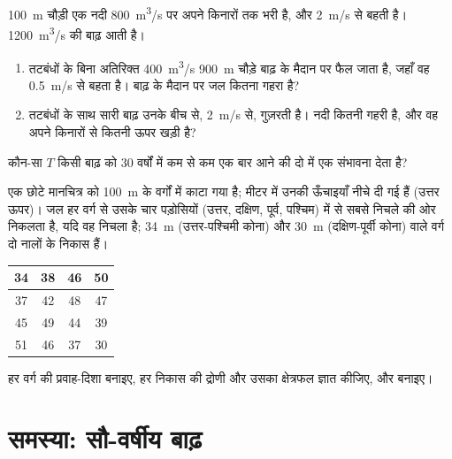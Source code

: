 \begin{exercise}[$\star\star\star$]\label{exo:g10:drainage-basins:13}
\qty{100}{m} चौड़ी एक नदी \qty{800}{m^3/s} पर अपने किनारों तक भरी है, और
\qty{2}{m/s} से बहती है। \qty{1200}{m^3/s} की बाढ़ आती है।
\begin{enumerate}
  \item तटबंधों के बिना अतिरिक्त \qty{400}{m^3/s} \qty{900}{m} चौड़े
        बाढ़ के मैदान पर फैल जाता है, जहाँ वह \qty{0.5}{m/s} से बहता है। बाढ़ के मैदान पर
        जल कितना गहरा है?
  \item तटबंधों के साथ सारी बाढ़ उनके बीच से, \qty{2}{m/s} से, गुज़रती है।
        नदी कितनी गहरी है, और वह अपने किनारों से कितनी ऊपर खड़ी है?
\end{enumerate}
\end{exercise}

\begin{exercise}[$\star\star\star$]\label{exo:g10:drainage-basins:14}
कौन-सा  $T$ किसी बाढ़ को \num{30} वर्षों में कम से कम एक बार आने की
दो में एक संभावना देता है?
\end{exercise}

\begin{exercise}[$\star\star\star$]\label{exo:g10:drainage-basins:15}
एक छोटे मानचित्र को \qty{100}{m} के वर्गों में काटा गया है; मीटर में उनकी ऊँचाइयाँ
नीचे दी गई हैं (उत्तर ऊपर)। जल हर वर्ग से उसके चार पड़ोसियों
(उत्तर, दक्षिण, पूर्व, पश्चिम) में से सबसे निचले की ओर निकलता है, यदि वह निचला है; \qty{34}{m} (उत्तर-पश्चिमी कोना) और \qty{30}{m} (दक्षिण-पूर्वी कोना) वाले वर्ग
दो नालों के
निकास हैं।
\begin{center}
\begin{tabular}{|c|c|c|c|}
\hline
34 & 38 & 46 & 50 \\ \hline
37 & 42 & 48 & 47 \\ \hline
45 & 49 & 44 & 39 \\ \hline
51 & 46 & 37 & 30 \\ \hline
\end{tabular}
\end{center}
हर वर्ग की प्रवाह-दिशा बनाइए, हर निकास की द्रोणी और
उसका क्षेत्रफल ज्ञात कीजिए, और  बनाइए।
\end{exercise}

\section{समस्या: सौ-वर्षीय बाढ़}

